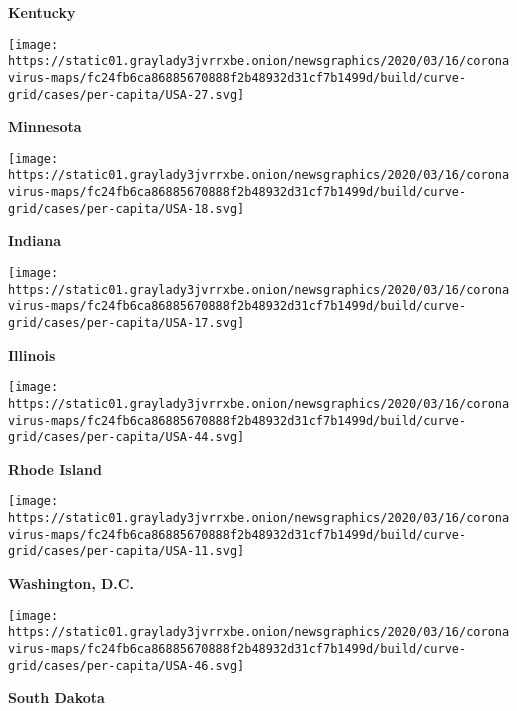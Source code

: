 \textbf{Kentucky}

\href{https://www.nytimes3xbfgragh.onion/interactive/2020/us/minnesota-coronavirus-cases.html}{}

\texttt{[image: https://static01.graylady3jvrrxbe.onion/newsgraphics/2020/03/16/coronavirus-maps/fc24fb6ca86885670888f2b48932d31cf7b1499d/build/curve-grid/cases/per-capita/USA-27.svg]}

\textbf{Minnesota}

\href{https://www.nytimes3xbfgragh.onion/interactive/2020/us/indiana-coronavirus-cases.html}{}

\texttt{[image: https://static01.graylady3jvrrxbe.onion/newsgraphics/2020/03/16/coronavirus-maps/fc24fb6ca86885670888f2b48932d31cf7b1499d/build/curve-grid/cases/per-capita/USA-18.svg]}

\textbf{Indiana}

\href{https://www.nytimes3xbfgragh.onion/interactive/2020/us/illinois-coronavirus-cases.html}{}

\texttt{[image: https://static01.graylady3jvrrxbe.onion/newsgraphics/2020/03/16/coronavirus-maps/fc24fb6ca86885670888f2b48932d31cf7b1499d/build/curve-grid/cases/per-capita/USA-17.svg]}

\textbf{Illinois}

\href{https://www.nytimes3xbfgragh.onion/interactive/2020/us/rhode-island-coronavirus-cases.html}{}

\texttt{[image: https://static01.graylady3jvrrxbe.onion/newsgraphics/2020/03/16/coronavirus-maps/fc24fb6ca86885670888f2b48932d31cf7b1499d/build/curve-grid/cases/per-capita/USA-44.svg]}

\textbf{Rhode Island}

\href{https://www.nytimes3xbfgragh.onion/interactive/2020/us/washington-dc-coronavirus-cases.html}{}

\texttt{[image: https://static01.graylady3jvrrxbe.onion/newsgraphics/2020/03/16/coronavirus-maps/fc24fb6ca86885670888f2b48932d31cf7b1499d/build/curve-grid/cases/per-capita/USA-11.svg]}

\textbf{Washington, D.C.}

\href{https://www.nytimes3xbfgragh.onion/interactive/2020/us/south-dakota-coronavirus-cases.html}{}

\texttt{[image: https://static01.graylady3jvrrxbe.onion/newsgraphics/2020/03/16/coronavirus-maps/fc24fb6ca86885670888f2b48932d31cf7b1499d/build/curve-grid/cases/per-capita/USA-46.svg]}

\textbf{South Dakota}

